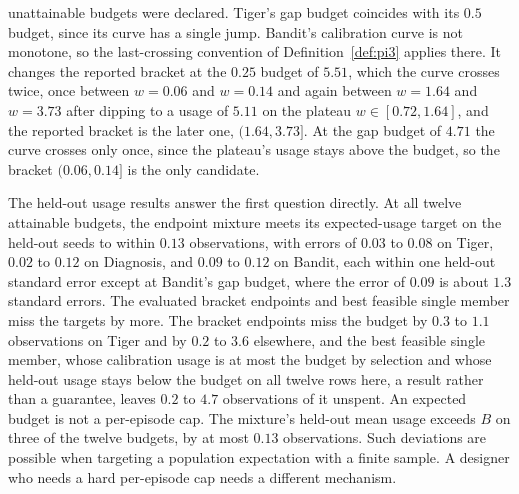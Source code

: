 unattainable budgets were declared. Tiger's gap budget coincides with its $0.5$ budget, since its curve has a single jump. Bandit's calibration curve is not monotone, so the last-crossing convention of Definition~\ref{def:pi3} applies there. It changes the reported bracket at the $0.25$ budget of $5.51$, which the curve crosses twice, once between $w{=}0.06$ and $w{=}0.14$ and again between $w{=}1.64$ and $w{=}3.73$ after dipping to a usage of $5.11$ on the plateau $w \in [0.72, 1.64]$, and the reported bracket is the later one, $(1.64, 3.73]$. At the gap budget of $4.71$ the curve crosses only once, since the plateau's usage stays above the budget, so the bracket $(0.06, 0.14]$ is the only candidate.

The held-out usage results answer the first question directly. At all twelve attainable budgets, the endpoint mixture meets its expected-usage target on the held-out seeds to within $0.13$ observations, with errors of $0.03$ to $0.08$ on Tiger, $0.02$ to $0.12$ on Diagnosis, and $0.09$ to $0.12$ on Bandit, each within one held-out standard error except at Bandit's gap budget, where the error of $0.09$ is about $1.3$ standard errors. The evaluated bracket endpoints and best feasible single member miss the targets by more. The bracket endpoints miss the budget by $0.3$ to $1.1$ observations on Tiger and by $0.2$ to $3.6$ elsewhere, and the best feasible single member, whose calibration usage is at most the budget by selection and whose held-out usage stays below the budget on all twelve rows here, a result rather than a guarantee, leaves $0.2$ to $4.7$ observations of it unspent. An expected budget is not a per-episode cap. The mixture's held-out mean usage exceeds $B$ on three of the twelve budgets, by at most $0.13$ observations. Such deviations are possible when targeting a population expectation with a finite sample. A designer who needs a hard per-episode cap needs a different mechanism.

